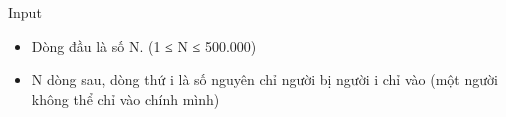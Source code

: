 Input
\begin{itemize}
	\item     Dòng đầu là số N. (1 ≤ N ≤ 500.000)   
	\item     N dòng sau, dòng thứ i là số nguyên chỉ người bị người i chỉ vào (một người không thể chỉ vào chính mình)   
\end{itemize}